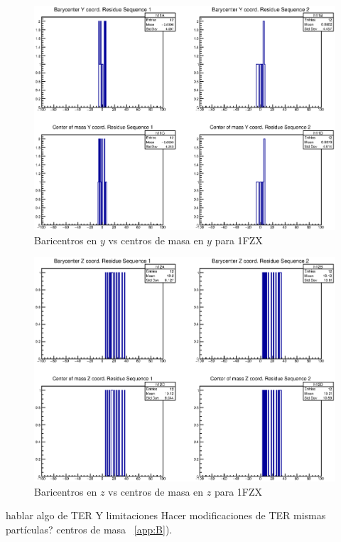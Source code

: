 \begin{figure}[htbp]
    \centering
    \includegraphics[width=1\linewidth]{./Figures/1fzy.eps}
  \caption[Baricentros en $y$ vs centros de masa en $y$ para 1FZX]{Baricentros en $y$ vs centros de masa en $y$ para 1FZX}
    \label{fig:cay}
\end{figure}

\begin{figure}[htbp]
    \centering
    \includegraphics[width=1\linewidth]{./Figures/1fzz.eps}
  \caption[Baricentros en $z$ vs centros de masa en $z$ para 1FZX]{Baricentros en $z$ vs centros de masa en $z$ para 1FZX}
    \label{fig:caz}
\end{figure}



hablar algo de TER Y limitaciones
Hacer modificaciones de TER
mismas partículas?
centros de masa
 ~\ref{app:B}).\\
